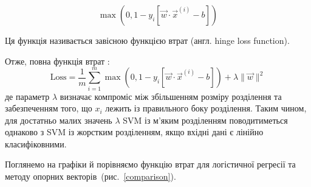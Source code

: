\documentclass[]{article}
\begin{document}
\def\mo{\max\left(0, 1 - y_i \left[ \vec{w}\cdot \vec{x}^{(i)} - b \right]\right)}
\def\mt{\max\left(0, 1 + y_i \left[ \vec{w}\cdot \vec{x}^{(i)} - b \right]\right)}

\begin{equation}
		 \mo
\end{equation}

Ця функція називається завісною функцією втрат (англ. hinge loss function).

Отже, повна функція втрат :
\begin{equation}
	\mathrm{Loss} = \frac1{m} \sum_{i = 1}^m \mo + \lambda \|\vec{w}\|^2
\end{equation}
де параметр $\lambda$ визначає компроміс між збільшенням розміру розділення та забезпеченням того, що $x_i$ лежить із правильного боку розділення. Таким чином, для достатньо малих значень $\lambda$ SVM із м'яким розділенням поводитиметься однаково з SVM із жорстким розділенням, якщо вхідні дані є лінійно класифіковними.

Поглянемо на графіки й порівняємо функцію втрат для логістичної регресії та методу опорних векторів~(рис.~\ref{comparison}).
\end{document}
